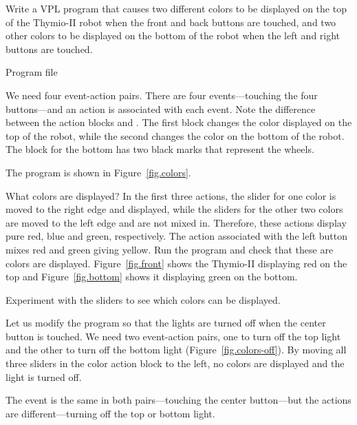 

Write a VPL program that causes two different colors to be displayed on
the top of the Thymio-II robot when the front and back buttons are
touched, and two other colors to be displayed on the bottom of the robot
when the left and right buttons are touched.

{\raggedleft \hfill Program file }

We need four event-action pairs. There are four events---touching the
four buttons---and an action is associated with each event. Note the
difference between the action blocks  and
. The first block changes the color
displayed on the top of the robot, while the second changes the color on
the bottom of the robot. The block for the bottom has two black marks
that represent the wheels.

The program is shown in Figure~\ref{fig.colors}.

What colors are displayed? In the first three actions, the slider for
one color is moved to the right edge and displayed, while the sliders
for the other two colors are moved to the left edge and are not mixed
in. Therefore, these actions display pure red, blue and green,
respectively. The action associated with the left button mixes red and
green giving yellow. Run the program and check that these are colors are
displayed. Figure~\ref{fig.front} shows the Thymio-II displaying red on
the top and Figure~\ref{fig.bottom} shows it displaying green on the
bottom.


Experiment with the sliders to see which colors can be displayed.


Let us modify the program so that the lights are turned off when the
center button is touched. We need two event-action pairs, one to turn
off the top light and the other to turn off the bottom light
(Figure~\ref{fig.colors-off}). By moving all three sliders in the color
action block to the left, no colors are displayed and the light is
turned off.

The event is the same in both pairs---touching the center button---but
the actions are different---turning off the top or bottom light. 


